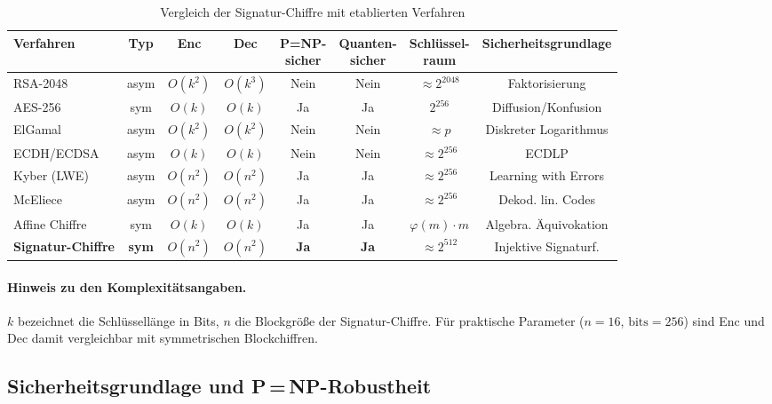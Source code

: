 ﻿\documentclass[a4paper,12pt]{scrreprt}
\theoremstyle{definition}
\begin{document}
\begin{table}
\centering
\caption{Vergleich der Signatur-Chiffre mit etablierten Verfahren}
\label{tab:vergleich2}
\begin{tabular}{@{}lccccccc@{}}
\toprule
\textbf{Verfahren} & \textbf{Typ} & \textbf{Enc} & \textbf{Dec}
  & \makecell{\textbf{P=NP-}\\\textbf{sicher}}
  & \makecell{\textbf{Quanten-}\\\textbf{sicher}}
  & \makecell{\textbf{Schlüssel-}\\\textbf{raum}}
  & \textbf{Sicherheitsgrundlage} \\
\midrule
RSA-2048 \cite{Riv78}        & asym & $O(k^2)$ & $O(k^3)$ & Nein & Nein & $\approx 2^{2048}$ & Faktorisierung \\
AES-256 \cite{DR02}          & sym  & $O(k)$   & $O(k)$   & Ja   & Ja   & $2^{256}$          & Diffusion/Konfusion \\
ElGamal \cite{ElG85}         & asym & $O(k^2)$ & $O(k^2)$ & Nein & Nein & $\approx p$        & Diskreter Logarithmus \\
ECDH/ECDSA                   & asym & $O(k)$   & $O(k)$   & Nein & Nein & $\approx 2^{256}$  & ECDLP \\
Kyber (LWE) \cite{ABD+22}    & asym & $O(n^2)$ & $O(n^2)$ & Ja   & Ja   & $\approx 2^{256}$  & Learning with Errors \\
McEliece \cite{McE78}        & asym & $O(n^2)$ & $O(n^2)$ & Ja   & Ja   & $\approx 2^{256}$  & Dekod. lin. Codes \\
Affine Chiffre \cite{Epp26c} & sym  & $O(k)$   & $O(k)$   & Ja   & Ja   & $\varphi(m)\cdot m$ & Algebra. Äquivokation \\
\midrule
\textbf{Signatur-Chiffre}    & \textbf{sym} & $O(n^2)$ & $O(n^2)$ & \textbf{Ja} & \textbf{Ja} & $\approx 2^{512}$ & Injektive Signaturf. \\
\bottomrule
\end{tabular}
\end{table}

\paragraph{Hinweis zu den Komplexitätsangaben.}
$k$ bezeichnet die Schlüssellänge in Bits, $n$ die Blockgröße der Signatur-Chiffre. Für praktische Parameter ($n=16$, $\mathrm{bits}=256$) sind Enc und Dec damit vergleichbar mit symmetrischen Blockchiffren.

\subsection{Sicherheitsgrundlage und P\,=\,NP-Robustheit}
\end{document}
